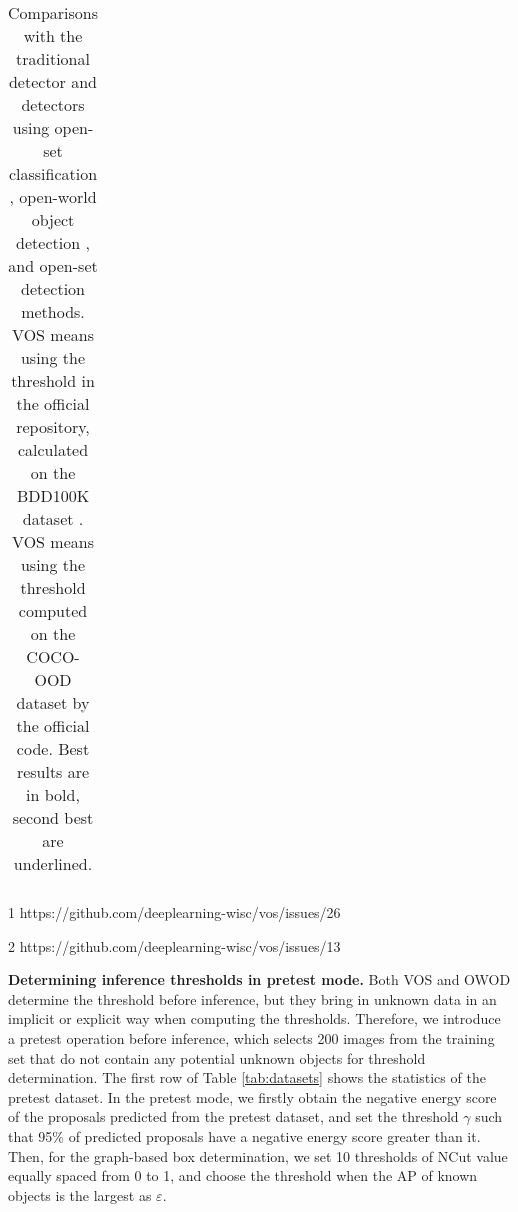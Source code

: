 \documentclass[10pt,twocolumn,letterpaper]{article}
\newcommand{\xf}[1]{{\color{black} #1}}
\begin{document}
\begin{table*}
\begin{threeparttable}
{{\begin{tabular}{c|l|c|cccc|ccccccc}
\bottomrule
\end{tabular}}}
\vspace{-0.5em}
\caption{Comparisons with the traditional detector  and detectors using open-set classification ,
open-world object detection ,
and open-set detection  methods. 
VOS means using the threshold in the official repository,
calculated on the BDD100K dataset \cite{yu2020bdd100k}.
VOS means using the threshold computed on the COCO-OOD dataset by the official code.
Best results are in bold,
second best are underlined.}
\begin{tablenotes}
\scriptsize
\item[1] https://github.com/deeplearning-wisc/vos/issues/26
\item[2] https://github.com/deeplearning-wisc/vos/issues/13
\end{tablenotes}
\end{threeparttable}
\label{tab:all_result}
\vspace{-0.5em}
\end{table*}

\noindent\textbf{Determining inference thresholds in pretest mode.}
Both VOS \cite{vos} and OWOD \cite{owod} determine \xf{the} threshold before inference,
but they bring in unknown data in an implicit or explicit way when computing the thresholds.
Therefore, we introduce a pretest operation before inference,
which \xf{selects 200 images from} the training set that do not contain any potential unknown objects for threshold determination.
The first row of Table \ref{tab:datasets} shows the statistics of the pretest dataset.
In the pretest mode,
we firstly obtain the negative energy score of the proposals predicted from the pretest dataset,
and set the threshold $\gamma$ such that 95\% of predicted proposals have a negative energy score greater than it.
Then,
for the graph-based box determination,
we set 10 thresholds of NCut value equally spaced from 0 to 1,
and choose the threshold when the AP of known objects is the largest as $\varepsilon$.
\end{document}
